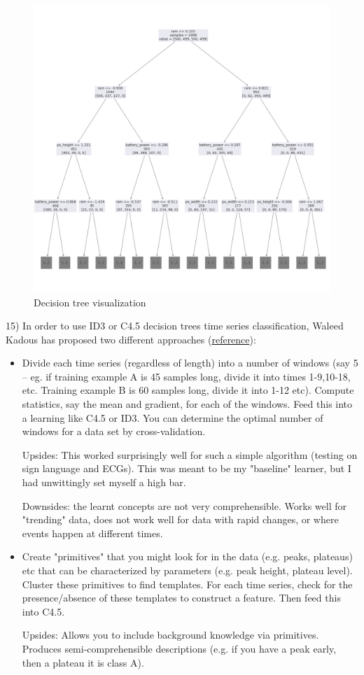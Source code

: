 \documentclass[11pt]{article}
\begin{document}
\begin{figure}
    \centering
    \includegraphics[width=1\textwidth]{tree.png}
    \caption{Decision tree visualization}
    \label{fig:1}
\end{figure}
15) In order to use ID3 or C4.5 decision trees time series classification, Waleed Kadous has proposed two different approaches (\href{https://www.quora.com/How-can-ID3-or-C4-5-decision-trees-be-used-for-time-series-classification}{reference}):
\begin{itemize}
\item Divide each time series (regardless of length) into a number of windows (say 5 -- eg. if training example A is 45 samples long, divide it into times 1-9,10-18, etc. Training example B is 60 samples long, divide it into 1-12 etc). Compute statistics, say the mean and gradient, for each of the windows. Feed this into a learning like C4.5 or ID3. You can determine the optimal number of windows for a data set by cross-validation.

Upsides: This worked surprisingly well for such a simple algorithm (testing on sign language and ECGs). This was meant to be my "baseline" learner, but I had unwittingly set myself a high bar.

Downsides: the learnt concepts are not very comprehensible. Works well for "trending" data, does not work well for data with rapid changes, or where events happen at different times.

\item Create "primitives" that you might look for in the data (e.g. peaks, plateaus) etc that can be characterized by parameters (e.g. peak height, plateau level). Cluster these primitives to find templates. For each time series, check for the presence/absence of these templates to construct a feature. Then feed this into C4.5.

Upsides: Allows you to include background knowledge via primitives. Produces semi-comprehensible descriptions (e.g. if you have a peak early, then a plateau it is class A).
\end{itemize}
\end{document}
